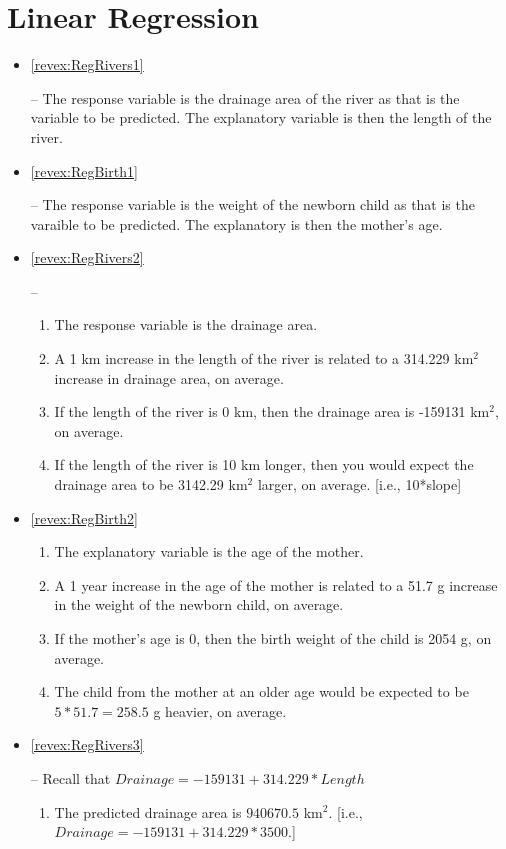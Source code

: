 \documentclass[10pt,openany]{book}\usepackage[]{graphicx}\usepackage[]{color}
\begin{document}
\section*{Linear Regression}
\begin{itemize}
  \item \hypertarget{ans:RegRivers1}{\ref{revex:RegRivers1}} -- The response variable is the drainage area of the river as that is the variable to be predicted.  The explanatory variable is then the length of the river.
  \item \hypertarget{ans:RegBirth1}{\ref{revex:RegBirth1}} -- The response variable is the weight of the newborn child as that is the varaible to be predicted.  The explanatory is then the mother's age.
  \item \hypertarget{ans:RegRivers2}{\ref{revex:RegRivers2}} --
    \begin{enumerate}
      \item The response variable is the drainage area.
      \item A 1 km increase in the length of the river is related to a 314.229 km$^{2}$ increase in drainage area, on average.
      \item If the length of the river is 0 km, then the drainage area is -159131 km$^{2}$, on average.
      \item If the length of the river is 10 km longer, then you would expect the drainage area to be 3142.29 km$^{2}$ larger, on average.  [i.e., 10*slope]
    \end{enumerate}
  \item \hypertarget{ans:RegBirth2}{\ref{revex:RegBirth2}}
    \begin{enumerate}
      \item The explanatory variable is the age of the mother.
      \item A 1 year increase in the age of the mother is related to a 51.7 g increase in the weight of the newborn child, on average.
      \item If the mother's age is 0, then the birth weight of the child is 2054 g, on average.
      \item The child from the mother at an older age would be expected to be $5*51.7=258.5$ g heavier, on average.
    \end{enumerate}
  \item \hypertarget{ans:RegRivers3}{\ref{revex:RegRivers3}} -- Recall that $Drainage=-159131+314.229*Length$
    \begin{enumerate}
      \item The predicted drainage area is $940670.5$ km$^{2}$.  [i.e., $Drainage=-159131+314.229*3500$.]

\end{enumerate}
\end{itemize}
\end{document}
